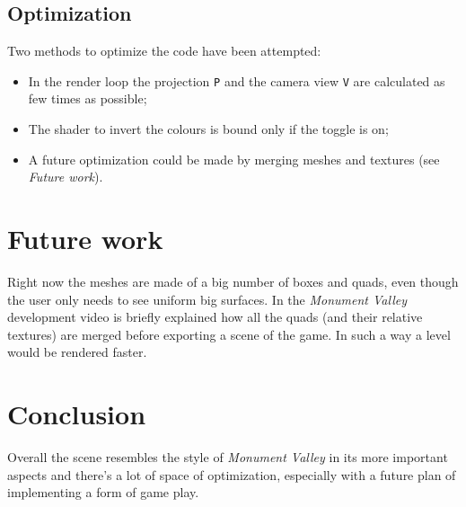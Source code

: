 \documentclass[10pt, a4paper]{article}
\begin{document}
\subsection{Optimization}
Two methods to optimize the code have been attempted:
\begin{itemize}
	\item In the render loop the projection \texttt{P} and the camera view \texttt{V} are calculated as few times as possible;
	\item The shader to invert the colours is bound only if the toggle is on;
	\item A future optimization could be made by merging meshes and textures (see \textit{Future work}).
\end{itemize}

\section{Future work}
Right now the meshes are made of a big number of boxes and quads, even though the user only needs to see uniform big surfaces. In the \textit{Monument Valley} development video \cite{Video1} is briefly explained how all the quads (and their relative textures) are merged before exporting a scene of the game. In such a way a level would be rendered faster.
	
\section{Conclusion}
Overall the scene resembles the style of \textit{Monument Valley} in its more important aspects and there's a lot of space of optimization, especially with a future plan of implementing a form of game play.


		
\end{document}
